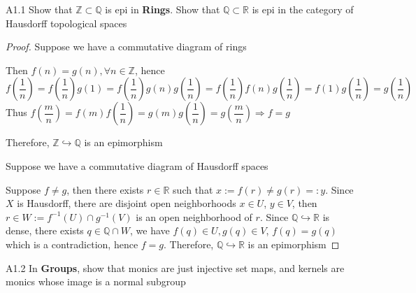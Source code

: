 \documentclass[main]{subfiles}
\begin{document}
\begin{customexercise}{A1.1}
Show that $\mathbb Z\subset \mathbb Q$ is epi in \textbf{Rings}. Show that $\mathbb Q\subset \mathbb R$ is epi in the category of Hausdorff topological spaces
\end{customexercise}

\begin{proof}
Suppose we have a commutative diagram of rings
\begin{center}
\end{center}
Then $f(n)=g(n), \forall n\in\mathbb Z$, hence
\[f\left(\frac{1}{n}\right)=f\left(\frac{1}{n}\right)g(1)=f\left(\frac{1}{n}\right)g(n)g\left(\frac{1}{n}\right)=f\left(\frac{1}{n}\right)f(n)g\left(\frac{1}{n}\right)=f(1)g\left(\frac{1}{n}\right)=g\left(\frac{1}{n}\right)\]
Thus $f\left(\dfrac{m}{n}\right)=f(m)f\left(\dfrac{1}{n}\right)=g(m)g\left(\dfrac{1}{n}\right)=g\left(\dfrac{m}{n}\right)\Rightarrow f=g$ \par
Therefore, $\mathbb Z\hookrightarrow\mathbb Q$ is an epimorphism \par
Suppose we have a commutative diagram of Hausdorff spaces
\begin{center}
\end{center}
Suppose $f\neq g$, then there exists $r\in\mathbb R$ such that $x:=f(r)\neq g(r)=:y$. Since $X$ is Hausdorff, there are disjoint open neighborhoods $x\in U$, $y\in V$, then $r\in W:=f^{-1}(U)\cap g^{-1}(V)$ is an open neighborhood of $r$. Since $\mathbb Q\hookrightarrow\mathbb R$ is dense, there exists $q\in\mathbb Q\cap W$, we have $f(q)\in U, g(q)\in V$, $f(q)=g(q)$ which is a contradiction, hence $f=g$. Therefore, $\mathbb Q\hookrightarrow\mathbb R$ is an epimorphism
\end{proof}

\begin{customexercise}{A1.2}
In \textbf{Groups}, show that monics are just injective set maps, and kernels are monics whose image is a normal subgroup
\end{customexercise}
\end{document}
